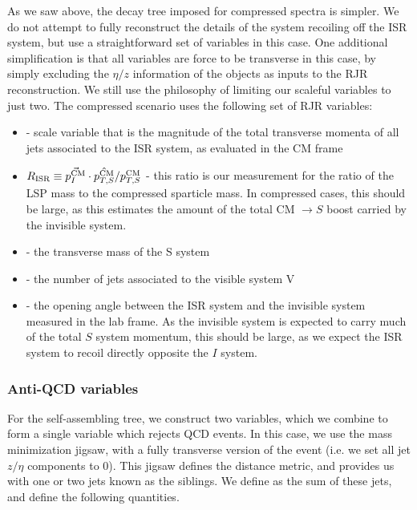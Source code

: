 As we saw above, the decay tree imposed for compressed spectra is simpler.
We do not attempt to fully reconstruct the details of the system recoiling off the ISR system, but use a straightforward set of variables in this case.
One additional simplification is that all variables are force to be transverse in this case, by simply excluding the $\eta/z$ information of the objects as inputs to the RJR reconstruction.
We still use the philosophy of limiting our scaleful variables to just two.
The compressed scenario uses the following set of RJR variables:
\begin{itemize}
\item \ptisr - scale variable that is the magnitude of the total transverse momenta of all jets associated to the ISR system, as evaluated in the CM frame
\item $R_{\text{ISR}} \equiv \vec{p_I^{\text{CM}}} \cdot \hat{p_{T,S}^{\text{CM}}} / p_{T,S}^{\text{CM}} $  - this ratio is our measurement for the ratio of the LSP mass to the compressed sparticle mass. In compressed cases, this should be large, as this estimates the amount of the total CM $\rightarrow S$ boost carried by the invisible system.
\item \MTS - the transverse mass of the S system
\item \NVjet - the number of jets associated to the visible system V
\item \dphiISR - the opening angle between the ISR system and the invisible system measured in the lab frame.  As the invisible system is expected to carry much of the total $S$ system momentum, this should be large, as we expect the ISR system to recoil directly opposite the $I$ system.
\end{itemize}

\subsubsection{Anti-QCD variables}

For the self-assembling tree, we construct two variables, which we combine to form a single variable which rejects QCD events.
In this case, we use the mass minimization jigsaw, with a fully transverse version of the event (i.e. we set all jet $z/\eta$ components to 0).
This jigsaw defines the distance metric, and provides us with one or two jets known as the \met siblings.
We define \psib as the sum of these jets, and define the following quantities.

